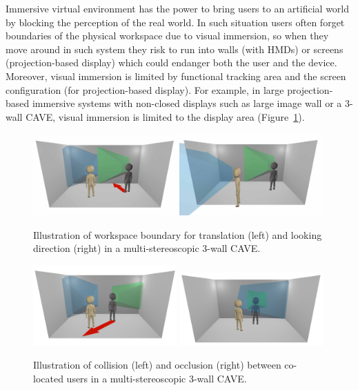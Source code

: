Immersive virtual environment has the power to bring users to an artificial world by blocking the perception of the real world. In such situation users often forget boundaries of the physical workspace due to visual immersion, so when they move around in such system they risk to run into walls (with HMDs) or screens (projection-based display) which could endanger both the user and the device. Moreover, visual immersion is limited by functional tracking area and the screen configuration (for projection-based display). For example, in large projection-based immersive systems with non-closed displays such as large image wall or a 3-wall CAVE, visual immersion is limited to the display area (Figure~\ref{fig:2_illu_system}).

\begin{figure}[htb]
  \centering
  \includegraphics[width=0.49\textwidth]{figures/ch2/illu_wall_col}
  \includegraphics[width=0.49\textwidth]{figures/ch2/illu_empty}
  \caption{\label{fig:2_illu_system}Illustration of workspace boundary for translation (left) and looking direction (right) in a multi-stereoscopic 3-wall CAVE.}
\end{figure}

\begin{figure}[htb]
  \centering
  \includegraphics[width=0.49\textwidth]{figures/ch2/illu_user_col}
  \includegraphics[width=0.49\textwidth]{figures/ch2/illu_occ}
  \caption{\label{fig:2_illu_users}Illustration of collision (left) and occlusion (right) between co-located users in a multi-stereoscopic 3-wall CAVE.}
\end{figure}


